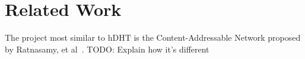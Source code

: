 \section{Related Work} \label{section:related-work}
The project most similar to hDHT is the Content-Addressable Network proposed by Ratnasamy, et al~\cite{ratnasamy2001scalable}. TODO: Explain how it's different
